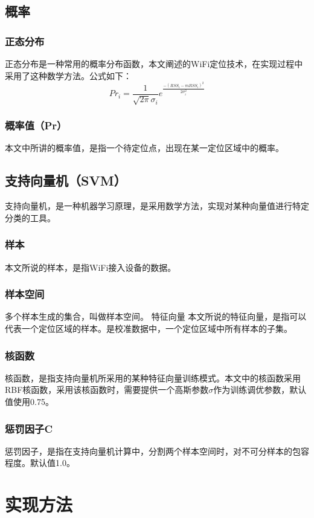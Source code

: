 \documentclass[a4paper, UTF8]{ctexart}
\begin{document}
\subsection{概率}
\subsubsection{正态分布}
正态分布是一种常用的概率分布函数，本文阐述的WiFi定位技术，在实现过程中采用了这种数学方法。公式如下：
\begin{equation}
  Pr_{i}=\frac{1}{\sqrt{2\pi}\sigma_{i}}e^{\frac{-(RSS_{i}-mRSS_{i})^{2}}{2\sigma_{i}^{2}}}
\end{equation}
\subsubsection{概率值（Pr）}
本文中所讲的概率值，是指一个待定位点，出现在某一定位区域中的概率。
\subsection{支持向量机（SVM）}
支持向量机，是一种机器学习原理，是采用数学方法，实现对某种向量值进行特定分类的工具。
\subsubsection{样本}
本文所说的样本，是指WiFi接入设备的数据。
\subsubsection{样本空间}
多个样本生成的集合，叫做样本空间。
特征向量
本文所说的特征向量，是指可以代表一个定位区域的样本。是校准数据中，一个定位区域中所有样本的子集。
\subsubsection{核函数}
核函数，是指支持向量机所采用的某种特征向量训练模式。本文中的核函数采用RBF核函数，采用该核函数时，需要提供一个高斯参数$\sigma$作为训练调优参数，默认值使用0.75。
\subsubsection{惩罚因子C}
惩罚因子，是指在支持向量机计算中，分割两个样本空间时，对不可分样本的包容程度。默认值1.0。



\section{实现方法}
\end{document}
